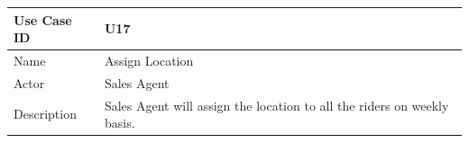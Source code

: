 \documentclass[12pt]{article}
\begin{document}
\begin{table}[H]
\begin{tabular}{|l|l|}
\hline
Use Case ID & U17                                                                                                                                                                                                                                                                                                                                                                                                                                                                                                                                                                                                                                                  \\ \hline
Name        & Assign Location                                                                                                                                                                                                                                                                                                                                                                                                                                                                                                                                                                                                                                      \\ \hline
Actor       & Sales Agent                                                                                                                                                                                                                                                                                                                                                                                                                                                                                                                                                                                                                                          \\ \hline
Description & Sales Agent will assign the location to all the riders   on weekly basis.                                                                                                                                                                                                                                                                                                                                                                                                                                                                                                                                                                            \\ \hline

\end{tabular}
\end{table}
\end{document}
